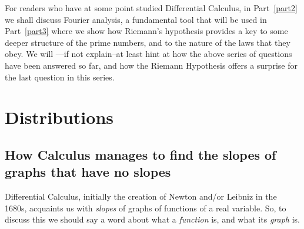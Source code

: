 \documentclass[openany]{book}
\theoremstyle{plain}
\theoremstyle{definition}
\newcommand{\RH}{Riemann Hypothesis\index{Riemann Hypothesis}}
\begin{document}
     
For readers who have at some point studied Differential Calculus, in 
Part~\ref{part2} we shall discuss Fourier analysis, a fundamental tool that will be used in Part~\ref{part3}
where we show how 
Riemann's hypothesis provides a key to some deeper structure of the
prime numbers, and to the nature of the laws that they obey. We will ---if not explain--at least 
hint at how the above series of questions have been answered so far,
and how the \RH{} offers a surprise for the last question in this
series.
 


   

    
     


\part{Distributions\label{part2}}


\chapter[Slopes of graphs that have no slopes]{How Calculus manages to
  find the slopes of graphs that have no slopes}
   
Differential Calculus, initially the creation of Newton and/or Leibniz
in the 1680s, acquaints us with {\it slopes} of graphs of functions of
a real variable.  So, to discuss this we should say a word about what
a {\it function} is, and what its {\it graph} is.
 
\end{document}
